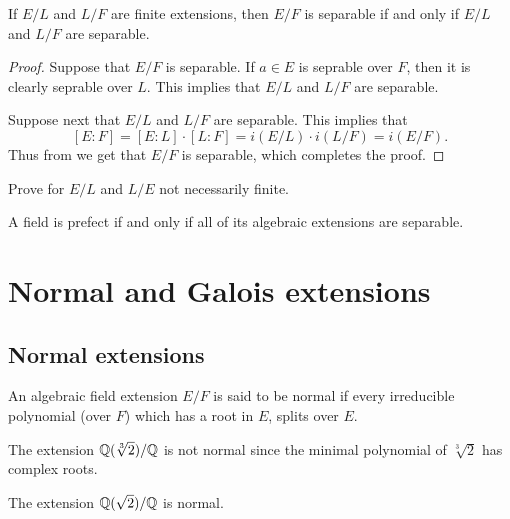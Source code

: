 \documentclass[11pt,a4paper]{article}
\begin{document}
\begin{corollary}
  \label{cor:seperability-of-extensions}
  If $E/L$ and $L/F$ are finite extensions, then $E/F$
  is separable if and only if $E/L$ and $L/F$ are separable.
\end{corollary}
\begin{proof}
  Suppose that $E/F$ is separable.
  If $a \in E$ is seprable over $F$,
  then it is clearly seprable over $L$.
  This implies that $E/L$ and $L/F$ are separable.

  Suppose next that $E/L$ and $L/F$ are separable.
  This implies that
  \[
    [E : F] =
    [E : L] \cdot [L : F] =
    i(E / L) \cdot i(L / F) = i(E / F).
  \]
  Thus from  we get that $E/F$ is separable,
  which completes the proof.
\end{proof}

\begin{exercise}
  Prove 
  for $E/L$ and $L/E$ not necessarily finite.
\end{exercise}

\begin{corollary}
  A field is prefect if and only if all of its algebraic extensions
  are separable.
\end{corollary}

\newpage

\section{Normal and Galois extensions}

\subsection{Normal extensions}

\begin{definition}
  An algebraic field extension $E/F$ is said to be normal if every
  irreducible polynomial (over $F$) which has a root in $E$,
  splits over $E$.
\end{definition}

\begin{example}
  The extension $\mathbb{Q}(\sqrt[3]{2})/\mathbb{Q}$ is not normal
  since the minimal polynomial of $\sqrt[3]{2}$
  has complex roots.
\end{example}

\begin{example}
  The extension $\mathbb{Q}(\sqrt{2})/\mathbb{Q}$ is normal.
\end{example}
\end{document}
